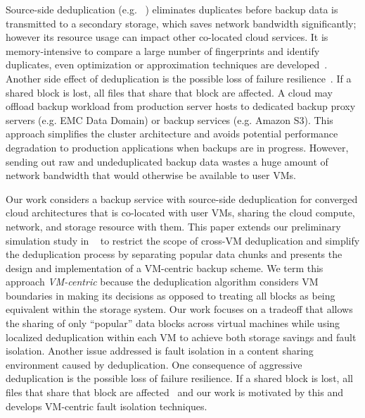 Source-side deduplication (e.g. ~\cite{Symantec2009})
 eliminates duplicates before backup data is transmitted
to a secondary storage, which saves network bandwidth significantly; however its resource
usage can impact other co-located cloud services. 
It is memory-intensive to compare a large number of fingerprints and identify
duplicates, even optimization or approximation techniques are developed~\cite{Guo2011,Dong2011,extreme_binning09}. 
 Another side effect of deduplication is the possible loss of failure
resilience~\cite{Reliability06}.  
If a shared block is lost, all files that
share that block are affected.  
A cloud may offload backup workload from production 
server hosts to dedicated backup proxy servers (e.g. EMC Data Domain) or
backup services (e.g. Amazon S3). This approach simplifies the cluster 
architecture and 
avoids potential performance degradation to production applications when 
backups are in progress.
However, sending out raw and undeduplicated backup data wastes a huge amount
of network bandwidth that would otherwise be available to user VMs. 

Our work  considers a backup service with source-side deduplication for converged cloud architectures
that is co-located with user VMs, sharing the cloud compute, network, and
storage resource with them.  
This paper extends our preliminary simulation study  in ~\cite{WeiZhangIEEE} to 
restrict the scope of cross-VM deduplication and simplify the deduplication process
by separating popular data chunks and presents the design and implementation of 
a VM-centric backup scheme.  
We term this approach {\em VM-centric} because the deduplication
algorithm considers VM boundaries in making its decisions as opposed to
treating all blocks as being equivalent within the storage system.
Our work focuses on a tradeoff that allows the sharing of only ``popular'' data blocks 
across virtual machines while using localized deduplication within each VM
to achieve both storage savings and fault isolation.
Another issue addressed is fault  isolation in a content sharing environment caused by deduplication.
One consequence of aggressive deduplication is the possible loss of failure
resilience.  If a shared block is lost, all files that
share that block are affected~\cite{Reliability06} and  our work is motivated by this
and develops VM-centric fault isolation techniques.


